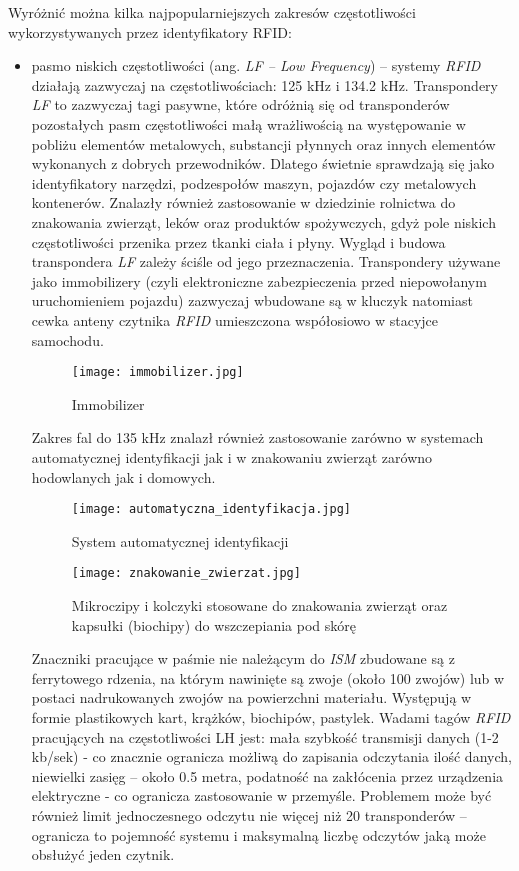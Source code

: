 \begin{itemize}
\begin{itemize}
Wyróżnić można kilka najpopularniejszych zakresów częstotliwości wykorzystywanych przez identyfikatory RFID:

\begin{itemize}\setlength{\itemsep}{0pt}
	\item pasmo niskich częstotliwości (ang. \emph {LF – Low Frequency}) – systemy \emph{RFID} działają zazwyczaj na częstotliwościach: 125 kHz i 134.2 kHz.
Transpondery \emph{LF} to zazwyczaj tagi pasywne, które odróżnią się od  transponderów pozostałych pasm częstotliwości małą wrażliwością na występowanie w pobliżu elementów metalowych, substancji płynnych oraz innych elementów wykonanych z dobrych przewodników. Dlatego świetnie sprawdzają się jako identyfikatory narzędzi, podzespołów maszyn, pojazdów czy metalowych kontenerów. Znalazły również zastosowanie w dziedzinie rolnictwa do znakowania zwierząt, leków oraz produktów spożywczych, gdyż pole niskich częstotliwości przenika przez tkanki ciała i płyny.
Wygląd i budowa transpondera \emph{LF} zależy ściśle od jego przeznaczenia. Transpondery używane jako immobilizery (czyli elektroniczne zabezpieczenia przed niepowołanym uruchomieniem pojazdu) zazwyczaj wbudowane są w kluczyk natomiast cewka anteny czytnika \emph{RFID} umieszczona współosiowo w stacyjce samochodu.
   
	\begin{figure}[h!]
	\centering
	    \texttt{[image: immobilizer.jpg]}
	    \caption{Immobilizer}
	\end{figure}

	\newpage

	Zakres fal do 135 kHz znalazł również zastosowanie zarówno w systemach automatycznej identyfikacji jak i w znakowaniu zwierząt  zarówno hodowlanych jak i domowych.

	\begin{figure}[h!]
	\centering
	    \texttt{[image: automatyczna\_identyfikacja.jpg]}
	    \caption{System automatycznej identyfikacji}
	\end{figure}
	
	\begin{figure}[h!]
	\centering
	    \texttt{[image: znakowanie\_zwierzat.jpg]}
	    \caption{Mikroczipy i kolczyki stosowane do znakowania zwierząt oraz kapsułki (biochipy) do wszczepiania pod skórę}
	\end{figure}
	
	Znaczniki pracujące w paśmie nie należącym do \emph{ISM} zbudowane są z ferrytowego rdzenia, na którym nawinięte są zwoje (około 100 zwojów) lub w postaci nadrukowanych zwojów na powierzchni materiału. Występują w formie plastikowych kart, krążków, biochipów, pastylek. Wadami tagów \emph{RFID} pracujących na częstotliwości LH jest: mała szybkość transmisji danych (1-2 kb/sek) - co znacznie ogranicza możliwą do zapisania odczytania ilość danych, niewielki zasięg – około 0.5 metra, podatność na zakłócenia przez urządzenia elektryczne  - co ogranicza zastosowanie w przemyśle. Problemem może być również limit jednoczesnego odczytu nie więcej niż 20 transponderów – ogranicza to pojemność systemu i maksymalną liczbę odczytów jaką może obsłużyć jeden czytnik. 


\end{itemize}
\end{itemize}
\end{itemize}
